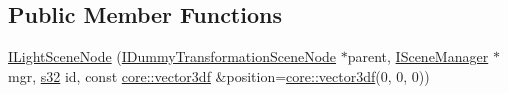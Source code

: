 \subsection*{Public Member Functions}
\begin{DoxyCompactItemize}
\item 
\hyperlink{classirr_1_1scene_1_1ILightSceneNode_a59891d791131ab7085584ee67bc95a8a}{I\+Light\+Scene\+Node} (\hyperlink{classirr_1_1scene_1_1IDummyTransformationSceneNode}{I\+Dummy\+Transformation\+Scene\+Node} $\ast$parent, \hyperlink{classirr_1_1scene_1_1ISceneManager}{I\+Scene\+Manager} $\ast$mgr, \hyperlink{namespaceirr_ac66849b7a6ed16e30ebede579f9b47c6}{s32} id, const \hyperlink{namespaceirr_1_1core_a06f169d08b5c429f5575acb7edbad811}{core\+::vector3df} \&position=\hyperlink{namespaceirr_1_1core_a06f169d08b5c429f5575acb7edbad811}{core\+::vector3df}(0, 0, 0))\hypertarget{classirr_1_1scene_1_1ILightSceneNode_a59891d791131ab7085584ee67bc95a8a}{}\label{classirr_1_1scene_1_1ILightSceneNode_a59891d791131ab7085584ee67bc95a8a}


\end{DoxyCompactItemize}
